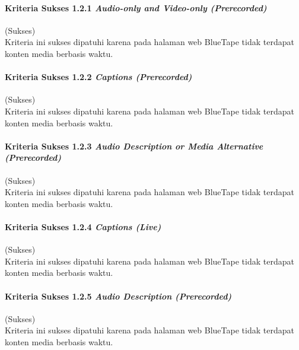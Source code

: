 \paragraph{Kriteria Sukses 1.2.1 \textit{Audio-only and Video-only (Prerecorded)}}
\label{par:kepatuhan_bluetape_kriteria_sukses_1.2.1}
(Sukses)\\

Kriteria ini sukses dipatuhi karena pada halaman web BlueTape tidak terdapat konten media berbasis waktu.

\paragraph{Kriteria Sukses 1.2.2 \textit{Captions (Prerecorded)}}
\label{par:kepatuhan_bluetape_kriteria_sukses_1.2.2}
(Sukses)\\

Kriteria ini sukses dipatuhi karena pada halaman web BlueTape tidak terdapat konten media berbasis waktu.

\paragraph{Kriteria Sukses 1.2.3 \textit{Audio Description or Media Alternative (Prerecorded)}}
\label{par:kepatuhan_bluetape_kriteria_sukses_1.2.3}
(Sukses)\\

Kriteria ini sukses dipatuhi karena pada halaman web BlueTape tidak terdapat konten media berbasis waktu.

\paragraph{Kriteria Sukses 1.2.4 \textit{Captions (Live)}}
\label{par:kepatuhan_bluetape_kriteria_sukses_1.2.4}
(Sukses)\\

Kriteria ini sukses dipatuhi karena pada halaman web BlueTape tidak terdapat konten media berbasis waktu.

\paragraph{Kriteria Sukses 1.2.5 \textit{Audio Description (Prerecorded)}}
\label{par:kepatuhan_bluetape_kriteria_sukses_1.2.5}
(Sukses)\\

Kriteria ini sukses dipatuhi karena pada halaman web BlueTape tidak terdapat konten media berbasis waktu.

